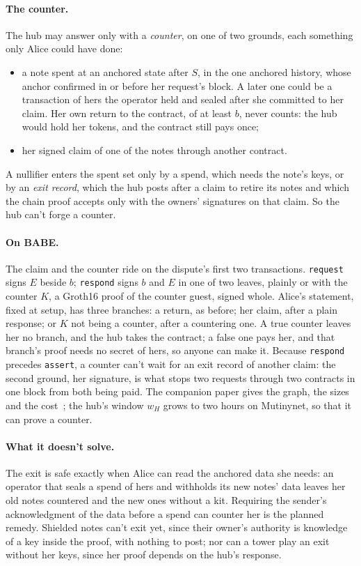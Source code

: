 \documentclass[11pt]{article}
\newcommand{\tx}[1]{\texttt{#1}}
\begin{document}
\paragraph{The counter.} The hub may answer only with a \emph{counter},
on one of two grounds, each something only Alice could have done:
\begin{itemize}[leftmargin=1.5em]
\item a note spent at an anchored state after $S$, in the one anchored
  history, whose anchor confirmed in or before her request's block. A
  later one could be a transaction of hers the operator held and
  sealed after she committed to her claim. Her own return to the
  contract, of at least $b$, never counts: the hub would hold her tokens,
  and the contract still pays once;
\item her signed claim of one of the notes through another contract.
\end{itemize}
A nullifier enters the spent set only by a spend, which needs the note's
keys, or by an \emph{exit record}, which the hub posts after a claim to
retire its notes and which the chain proof accepts only with the owners'
signatures on that claim. So the hub can't forge a counter.

\paragraph{On BABE.} The claim and the counter ride on the dispute's
first two transactions. \tx{request} signs $E$ beside $b$; \tx{respond}
signs $b$ and $E$ in one of two leaves, plainly or with the counter $K$,
a Groth16 proof of the counter guest, signed whole. Alice's statement,
fixed at setup, has three branches: a return, as before; her claim,
after a plain response; or $K$ not being a counter, after a countering
one. A true counter leaves her no branch, and the hub takes the
contract; a false one pays her, and that branch's proof needs no secret
of hers, so anyone can make it. Because \tx{respond} precedes
\tx{assert}, a counter can't wait for an exit record of another claim:
the second ground, her signature, is what stops two requests through two
contracts in one block from both being paid. The companion paper gives
the graph, the sizes and the cost~\cite{lichenbabe}; the hub's window
$w_H$ grows to two hours on Mutinynet, so that it can prove a counter.

\paragraph{What it doesn't solve.} The exit is safe exactly when Alice
can read the anchored data she needs: an operator that seals a spend of
hers and withholds its new notes' data leaves her old notes countered
and the new ones without a kit. Requiring the sender's acknowledgment of
the data before a spend can counter her is the planned remedy. Shielded
notes can't exit yet, since their owner's authority is knowledge of a
key inside the proof, with nothing to post; nor can a tower play an exit
without her keys, since her proof depends on the hub's response.
\end{document}
